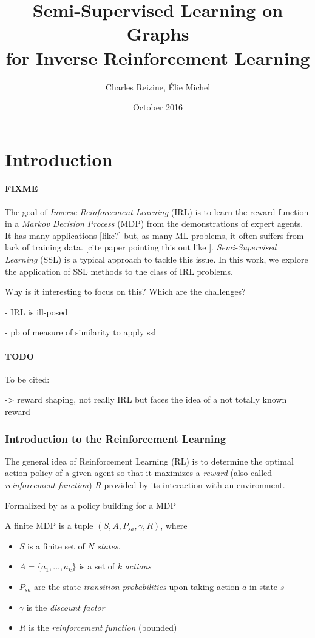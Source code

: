 \documentclass{article}
\title{Semi-Supervised Learning on Graphs \\
for Inverse Reinforcement Learning}
\author{Charles Reizine, Élie Michel}
\date{October 2016}
\begin{document}
\maketitle

\section{Introduction}

\paragraph{FIXME}
The goal of \emph{Inverse Reinforcement Learning} (IRL) is to learn the reward function in a \emph{Markov Decision Process} (MDP) from the demonstrations of expert agents. It has many applications [like?] but, as many ML problems, it often suffers from lack of training data. [cite paper pointing this out like \cite{Vasquez14}]. \emph{Semi-Supervised Learning} (SSL) is a typical approach to tackle this issue. In this work, we explore the application of SSL methods to the class of IRL problems.

Why is it interesting to focus on this?
Which are the challenges?

 - IRL is ill-posed

 - pb of measure of similarity to apply ssl


\paragraph{TODO} To be cited:

\cite{Ng99} -> reward shaping, not really IRL but faces the idea of a not totally known reward

\cite{Abbeel04}

\subsubsection{Introduction to the Reinforcement Learning}

The general idea of Reinforcement Learning (RL) is to determine the optimal action policy of a given agent so that it maximizes a \emph{reward} (also called \emph{reinforcement function}) $R$ provided by its interaction with an environment.

Formalized by \cite{Sutton98} as a policy building for a MDP

A finite MDP is a tuple $(S,A,P_{sa},\gamma,R)$, where
\begin{itemize}
    \item $S$ is a finite set of $N$ \emph{states}.
    \item $A=\{a_1,...,a_k\}$ is a set of $k$ \emph{actions} 
    \item $P_{sa}$ are the state \emph{transition probabilities} upon taking action $a$ in state $s$
    \item $\gamma$ is the \emph{discount factor}
    \item $R$ is the \emph{reinforcement function} (bounded) 
\end{itemize}
\end{document}
